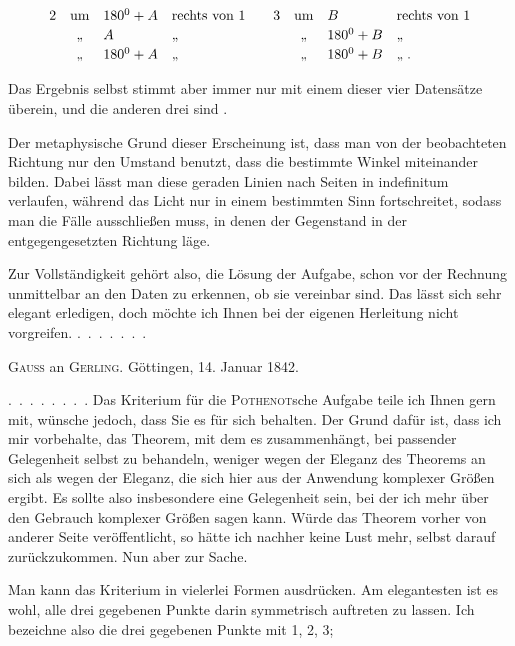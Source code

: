 \[
\begin{array}{rcll@{\qquad}rcll}
2 & \text{um} & 180^0+A & \text{rechts von }1 & 3 & \text{um} & B & \text{rechts von }1\\[2pt]
 & \text{,,} & A & \text{,,} & & \text{,,} & 180^0+B & \text{,,}\\[2pt]
 & \text{,,} & 180^0+A & \text{,,} & & \text{,,} & 180^0+B & \text{,,}\;.
\end{array}
\]

Das Ergebnis selbst stimmt aber immer nur mit einem dieser vier Datensätze überein, und die anderen drei sind .

Der metaphysische Grund dieser Erscheinung ist, dass man von der beobachteten Richtung nur den Umstand benutzt, dass die  bestimmte Winkel miteinander bilden. Dabei lässt man diese geraden Linien nach  Seiten in indefinitum verlaufen, während das Licht nur in einem bestimmten Sinn fortschreitet, sodass man die Fälle ausschließen muss, in denen der Gegenstand in der entgegengesetzten Richtung läge.

Zur Vollständigkeit gehört also, die Lösung der Aufgabe, schon vor der Rechnung unmittelbar an den Daten zu erkennen, ob sie vereinbar sind. Das lässt sich sehr elegant erledigen, doch möchte ich Ihnen bei der eigenen Herleitung nicht vorgreifen. \mbox{. . . . . . .}



\centerline{\textsc{Gauss} an \textsc{Gerling}. Göttingen, 14. Januar 1842.}

\indent \mbox{. . . . . . . .} Das Kriterium für die \textsc{Pothenot}sche Aufgabe teile ich Ihnen gern mit, wünsche jedoch, dass Sie es für sich behalten. Der Grund dafür ist, dass ich mir vorbehalte, das Theorem, mit dem es zusammenhängt, bei passender Gelegenheit selbst zu behandeln, weniger wegen der Eleganz des Theorems an sich als wegen der Eleganz, die sich hier aus der Anwendung komplexer Größen ergibt. Es sollte also insbesondere eine Gelegenheit sein, bei der ich mehr über den Gebrauch komplexer Größen sagen kann. Würde das Theorem vorher von anderer Seite veröffentlicht, so hätte ich nachher keine Lust mehr, selbst darauf zurückzukommen. Nun aber zur Sache.

Man kann das Kriterium in vielerlei Formen ausdrücken. Am elegantesten ist es wohl, alle drei gegebenen Punkte darin symmetrisch auftreten zu lassen. Ich bezeichne also die drei gegebenen Punkte mit 1, 2, 3;\space%
